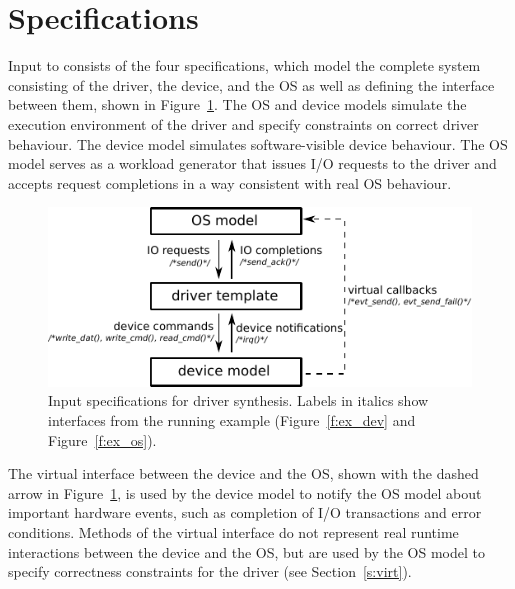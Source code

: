 %
%        
%        

\section{Specifications}
\label{s:specifications}

Input to \termite consists of the four specifications, which model the complete system consisting of the driver, the device, and the OS as well as defining the interface between them, shown in Figure~\ref{f:actions}.  The OS and device models simulate the execution environment of the driver and specify constraints on correct driver behaviour.  The device model simulates software-visible device behaviour.  The OS model serves as a workload generator that issues I/O requests to the driver and accepts request completions in a way consistent with real OS behaviour.

\begin{figure}
    \center
    \includegraphics[width=0.85\linewidth]{imgs/actions.pdf}
    \caption{Input specifications for driver synthesis.  
    Labels in italics show interfaces from the running example
(Figure~\ref{f:ex_dev} and Figure~\ref{f:ex_os}).}\label{f:actions}
\end{figure}

The virtual interface between the device and the OS, shown with the dashed arrow in Figure~\ref{f:actions}, is used by the device model to notify the OS model about important hardware events, such as completion of I/O transactions and error conditions.  Methods of the virtual interface do not represent real runtime interactions between the device and the OS, but are used by the OS model to specify correctness constraints for the driver (see Section~\ref{s:virt}).

